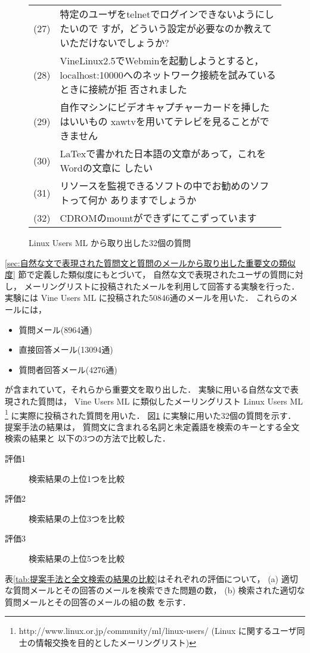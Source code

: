 \begin{figure}[t]
\begin{center}
{\begin{tabular}[t]{rp{120mm}}
	   (27) & 特定のユーザをtelnetでログインできないようにしたいので
	   すが，どういう設定が必要なのか教えていただけないでしょうか?\\
	  (28) & VineLinux2.5でWebminを起動しようとすると，
	  localhost:10000へのネットワーク接続を試みているときに接続が拒
	  否されました \\
	  (29) & 自作マシンにビデオキャプチャーカードを挿したはいいもの
	  xawtvを用いてテレビを見ることができません \\
	  (30) & LaTexで書かれた日本語の文章があって，これをWordの文章に
	   したい \\
	  (31) & リソースを監視できるソフトの中でお勧めのソフトって何か
	  ありますでしょうか \\
	  (32) & CDROMのmountができずにてこずっています \\
	  \end{tabular}
	  }
	  \caption{Linux Users ML から取り出した32個の質問}
	  \label{fig:Linux Users ML から取り出した32個の質問}
	 \end{center}
	\end{figure}

 \ref{sec:自然な文で表現された質問文と質問のメールから取り出した重要文の類似度}
 節で定義した類似度にもとづいて，
 自然な文で表現されたユーザの質問に対し，
 メーリングリストに投稿されたメールを利用して回答する実験を行った．
 実験には Vine Users ML に投稿された50846通のメールを用いた．
 これらのメールには，
 \begin{itemize}
  \item 質問メール(8964通)
  \item 直接回答メール(13094通)
  \item 質問者回答メール(4276通)
 \end{itemize}
 が含まれていて，それらから重要文を取り出した．
 実験に用いる自然な文で表現された質問は，
 Vine Users ML に類似したメーリングリスト
 Linux Users ML
 \footnote{http://www.linux.or.jp/community/ml/linux-users/
 (Linux に関するユーザ同士の情報交換を目的としたメーリングリスト)}
 に実際に投稿された質問を用いた．
 図\ref{fig:Linux Users ML から取り出した32個の質問}
 に実験に用いた32個の質問を示す．
 提案手法の結果は，
 質問文に含まれる名詞と未定義語を検索のキーとする全文検索の結果と
 以下の3つの方法で比較した．
 \begin{description}
  \item[評価1] 検索結果の上位1つを比較
  \item[評価2] 検索結果の上位3つを比較
  \item[評価3] 検索結果の上位5つを比較
 \end{description}
 表\ref{tab:提案手法と全文検索の結果の比較}はそれぞれの評価について，
 (a) 適切な質問メールとその回答のメールを検索できた問題の数，
 (b) 検索された適切な質問メールとその回答のメールの組の数
 を示す．


